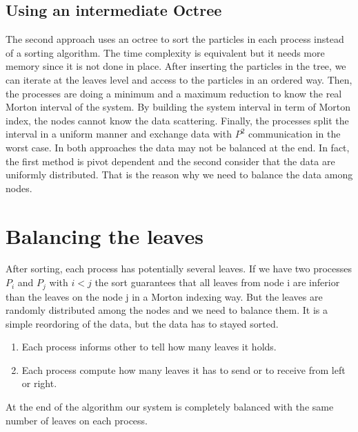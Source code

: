 \documentclass[12pt,letterpaper,titlepage]{report}
\begin{document}
\subsection{Using an intermediate Octree}
The second approach uses an octree to sort the particles in each process instead of a sorting algorithm.
The time complexity is equivalent but it needs more memory since it is not done in place.
After inserting the particles in the tree, we can iterate at the leaves level and access to the particles in an ordered way.
Then, the processes are doing a minimum and a maximum reduction to know the real Morton interval of the system.
By building the system interval in term of Morton index, the nodes cannot know the data scattering.
Finally, the processes split the interval in a uniform manner and exchange data with $P^{2}$ communication in the worst case.
\newline
\newline
In both approaches the data may not be balanced at the end.
In fact, the first method is pivot dependent and the second consider that the data are uniformly distributed.
That is the reason why we need to balance the data among nodes.

\section{Balancing the leaves}
After sorting, each process has potentially several leaves.
If we have two processes $P_{i}$ and $P_{j}$ with $i < j$ the sort guarantees that all leaves from node i are inferior than the leaves on the node j in a Morton indexing way.
But the leaves are randomly distributed among the nodes and we need to balance them.
It is a simple reordoring of the data, but the data has to stayed sorted.

\begin{enumerate}
\item Each process informs other to tell how many leaves it holds.
\item Each process compute how many leaves it has to send or to receive from left or right.
\end{enumerate}
At the end of the algorithm our system is completely balanced with the same number of leaves on each process.
\end{document}
